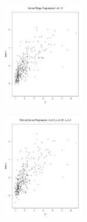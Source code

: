 \documentclass[11pt, oneside]{article}   	%
\begin{document}
\begin{figure}[h]
        \centering
        \begin{subfigure}[b]{0.475\textwidth}
            \centering
            \includegraphics[width=\textwidth, height=4.5cm]{krr_15.pdf}
            \caption{}\label{krr_15}
        \end{subfigure}
        \quad
        \begin{subfigure}[b]{0.475\textwidth}
            \centering
            \includegraphics[width=\textwidth, height=4.5cm]{rrkr_15.pdf}
            \caption{}\label{rrkr_15}
        \end{subfigure}
        \caption{}
\end{figure}
\end{document}
